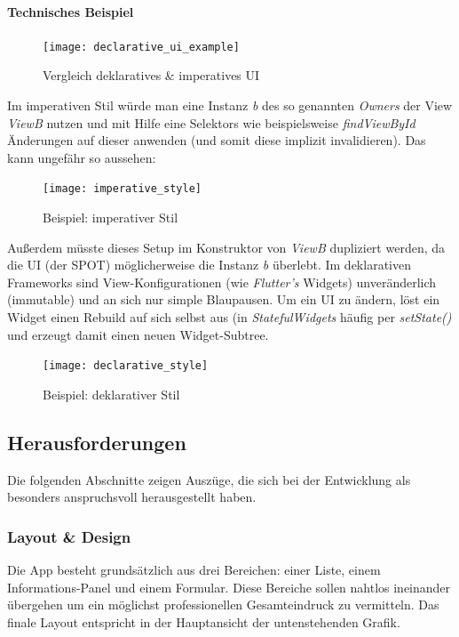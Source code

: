 \paragraph{Technisches Beispiel}\mbox{}
\hfill
\break

\begin{figure}[H]
    \centering
    \texttt{[image: declarative\_ui\_example]}
    \caption{Vergleich deklaratives \& imperatives UI}
\end{figure}

Im imperativen Stil würde man eine Instanz \textit{b} des so
genannten \textit{Owners} der View \textit{ViewB} nutzen
und mit Hilfe eine Selektors wie beispielsweise \textit{findViewById}
Änderungen auf dieser anwenden (und somit diese implizit invalidieren).
Das kann ungefähr so aussehen:

\begin{figure}[H]
    \centering
    \texttt{[image: imperative\_style]}
    \caption{Beispiel: imperativer Stil}
\end{figure}

Außerdem müsste dieses Setup im Konstruktor von \textit{ViewB} dupliziert
werden, da die UI (der \ac{SPOT}) möglicherweise die Instanz \textit{b} überlebt.
Im deklarativen Frameworks sind View-Konfigurationen
(wie \textit{Flutter's} Widgets) unveränderlich (immutable) und an sich
nur simple Blaupausen. Um ein UI zu ändern, löst ein Widget einen Rebuild
auf sich selbst aus (in \textit{StatefulWidgets} häufig per \textit{setState()}
und erzeugt damit einen neuen Widget-Subtree.

\begin{figure}[H]
    \centering
    \texttt{[image: declarative\_style]}
    \caption{Beispiel: deklarativer Stil}
\end{figure}



\subsection{Herausforderungen}

Die folgenden Abschnitte zeigen Auszüge, die sich bei der Entwicklung
als besonders anspruchsvoll herausgestellt haben.

\subsubsection{Layout \& Design}

Die App besteht grundsätzlich aus drei Bereichen:
einer Liste, einem Informations-Panel und einem Formular.
Diese Bereiche sollen nahtlos ineinander übergehen um ein
möglichst professionellen Gesamteindruck zu vermitteln.
Das finale Layout entspricht in der Hauptansicht der untenstehenden Grafik.

